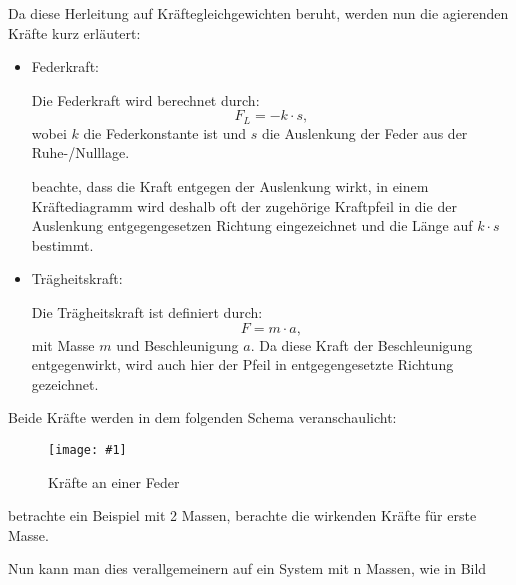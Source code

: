 \documentclass[ngerman,BCOR=4mm]{tudscrreprt}
\newcommand{\bild}[2]{\texttt{[image: \#1]}}
\theoremstyle{plain} %
\theoremstyle{definition} %
\theoremstyle{remark}
\begin{document}
            Da diese Herleitung auf Kräftegleichgewichten beruht, werden nun die agierenden Kräfte kurz erläutert:

            \begin{itemize}
                  \item Federkraft:
                  
                        Die Federkraft wird berechnet durch:
                        \begin{equation}
                              \label{eqn: Federkraft}
                              F_L = -k\cdot s,
                        \end{equation}
                        wobei $k$ die Federkonstante ist und $s$ die Auslenkung der Feder aus der Ruhe-/Nulllage.

                        beachte, dass die Kraft entgegen der Auslenkung wirkt,
                        in einem Kräftediagramm wird deshalb oft der zugehörige Kraftpfeil in die der Auslenkung entgegengesetzen Richtung eingezeichnet und die Länge auf $k\cdot s$ bestimmt.
                  \item Trägheitskraft:
                  
                        Die Trägheitskraft ist definiert durch:
                        \begin{equation}
                              \label{eqn: Trägheitskraft}
                              F = m\cdot a,
                        \end{equation}
                        mit Masse $m$ und Beschleunigung $a$.
                        Da diese Kraft der Beschleunigung entgegenwirkt, wird auch hier der Pfeil in entgegengesetzte Richtung gezeichnet.
            \end{itemize}

            Beide Kräfte werden in dem folgenden Schema veranschaulicht:

                  
            \begin{figure}[htp]
                  \centering
                  \bild{"./src/KräfteAnFeder.png"}{0.3}
                  \label{fig: KräfteAnFeder}
                  \caption{Kräfte an einer Feder}\cite{federkraft}
            \end{figure}
            


            betrachte ein Beispiel mit 2 Massen, berachte die wirkenden Kräfte für erste Masse.

            Nun kann man dies verallgemeinern auf ein System mit n Massen, wie in Bild
\end{document}
